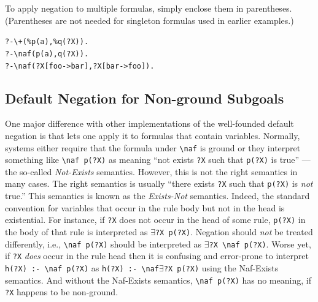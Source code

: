 \documentclass[11pt]{article}
\newcommand{\ERGO}{\mbox{\smaller{\ensuremath{\cal{E}}\smaller{{\sc{RGO}}}}}\xspace}
\newcommand{\FLSYSTEM}{\ERGO}
\newcommand{\bs}{\textbackslash}
\newcommand{\PLGNAF}{\mbox{\texttt{\bs}+}\xspace}
\newcommand{\RULELOGNAF}{{\texttt{{\bs}naf}}\xspace}
\begin{document}
To apply negation to multiple formulas, simply enclose them in
parentheses. (Parentheses are not needed for singleton formulas used in
earlier examples.)
\begin{alltt}
       ?- \PLGNAF(\%p(a),\%q(?X)).
       ?- \RULELOGNAF(p(a),q(?X)).
       ?- \RULELOGNAF(?X[foo->bar], ?X[bar->foo]).
\end{alltt}

\subsection{Default Negation for Non-ground Subgoals}
\label{sec-nonground-naf}

One major difference with other implementations of the well-founded default
negation is that \FLSYSTEM lets one apply it to formulas that contain variables.
Normally, systems either require that the formula under \texttt{\RULELOGNAF} is
ground or they interpret something like \texttt{\RULELOGNAF p(?X)} as meaning ``not
exists \texttt{?X} such that \texttt{p(?X)} is true'' --- the so-called
\emph{Not-Exists} semantics.
However, this is not the right semantics in many cases. The right semantics
is usually ``there exists \texttt{?X} such that \texttt{p(?X)} is
\emph{not} true.'' This semantics is known as the \emph{Exists-Not} semantics.
Indeed, the standard convention for variables that occur in the rule body
but not in the head is existential. For instance, if \texttt{?X} does not
occur in the head of some rule, \texttt{p(?X)} in the body  of that rule
is interpreted as \texttt{$\exists$?X p(?X)}. Negation should \emph{not}  be treated
differently, i.e., \texttt{\RULELOGNAF p(?X)}   should be interpreted as
\texttt{$\exists$?X \RULELOGNAF p(?X)}. Worse yet, if \texttt{?X} \emph{does} occur in the
rule head then it is confusing and error-prone to interpret
\texttt{h(?X) :- \RULELOGNAF p(?X)} as  \texttt{h(?X) :- \RULELOGNAF $\exists$?X p(?X)} using the Naf-Exists
semantics. And without the Naf-Exists semantics, \texttt{\RULELOGNAF p(?X)}  has no
meaning, if \texttt{?X} happens to be non-ground.
\end{document}
